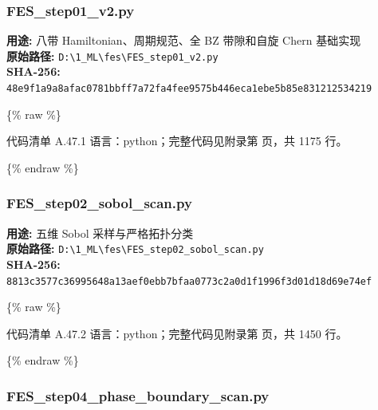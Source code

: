 \documentclass[lang=cn,scheme=chinese,color=blue,device=normal,toc=onecol,math=cm]{elegantbook}
\begin{document}
\subsubsection{FES\_\allowbreak{}step01\_\allowbreak{}v2.py}


\textbf{用途:} 八带 Hamiltonian、周期规范、全 BZ 带隙和自旋 Chern 基础实现\\ \textbf{原始路径:} \texttt{D:\textbackslash{}\allowbreak{}1\_\allowbreak{}ML\textbackslash{}\allowbreak{}fes\textbackslash{}\allowbreak{}FES\_\allowbreak{}step01\_\allowbreak{}v2.py}\\ \textbf{SHA-256:} \texttt{48e9f1a9a8afac0781bbff7a72fa4fee9575b446eca1ebe5b85e831212534219}\par


\{\% raw \%\}\par


\begin{codeindexbox}{代码清单 A.47.1}
语言：python；完整代码见附录第 \pageref{code:47:1} 页，共 1175 行。
\end{codeindexbox}


\{\% endraw \%\}\par


\subsubsection{FES\_\allowbreak{}step02\_\allowbreak{}sobol\_\allowbreak{}scan.py}


\textbf{用途:} 五维 Sobol 采样与严格拓扑分类\\ \textbf{原始路径:} \texttt{D:\textbackslash{}\allowbreak{}1\_\allowbreak{}ML\textbackslash{}\allowbreak{}fes\textbackslash{}\allowbreak{}FES\_\allowbreak{}step02\_\allowbreak{}sobol\_\allowbreak{}scan.py}\\ \textbf{SHA-256:} \texttt{8813c3577c36995648a13aef0ebb7bfaa0773c2a0d1f1996f3d01d18d69e74ef}\par


\{\% raw \%\}\par


\begin{codeindexbox}{代码清单 A.47.2}
语言：python；完整代码见附录第 \pageref{code:47:2} 页，共 1450 行。
\end{codeindexbox}


\{\% endraw \%\}\par


\subsubsection{FES\_\allowbreak{}step04\_\allowbreak{}phase\_\allowbreak{}boundary\_\allowbreak{}scan.py}
\end{document}
